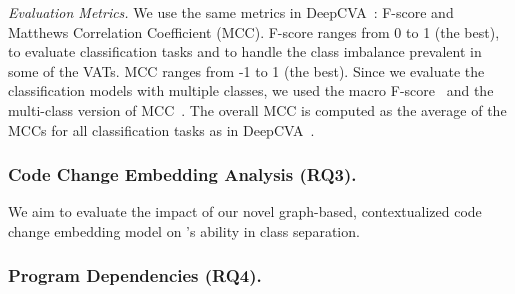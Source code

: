 \emph{Evaluation Metrics.} We use the same metrics in
DeepCVA~\cite{deepCVA-ase21}: F-score and Matthews Correlation
Coefficient (MCC). F-score ranges from 0 to 1 (the best), to evaluate
classification tasks and to handle the class imbalance prevalent in
some of the VATs. MCC ranges from -1 to 1 (the best).
Since we evaluate the classification models with multiple classes,
we used the macro F-score~\cite{spanos2018multi} and the multi-class
version of MCC~\cite{gorodkin04}. The overall MCC is computed as the
average of the MCCs for all classification tasks as in
DeepCVA~\cite{deepCVA-ase21}.









\subsubsection{Code Change Embedding Analysis (RQ3).}

We aim to evaluate the impact of our novel graph-based, contextualized
code change embedding model on {\tool}'s ability in class separation.



\subsubsection{Program Dependencies (RQ4).}

